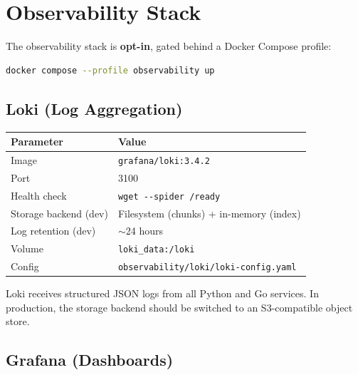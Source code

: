 
\section{Observability Stack}
\label{sec:observability}

The observability stack is \textbf{opt-in}, gated behind a Docker Compose
profile:

\begin{lstlisting}[language=bash, caption={Enabling the observability stack}]
docker compose --profile observability up
\end{lstlisting}

\subsection{Loki (Log Aggregation)}

\begin{tabular}{@{}ll@{}}
\toprule
\textbf{Parameter}    & \textbf{Value} \\
\midrule
Image                 & \texttt{grafana/loki:3.4.2} \\
Port                  & 3100 \\
Health check          & \texttt{wget -{}-spider /ready} \\
Storage backend (dev) & Filesystem (chunks) + in-memory (index) \\
Log retention (dev)   & $\sim$24 hours \\
Volume                & \texttt{loki\_data:/loki} \\
Config                & \texttt{observability/loki/loki-config.yaml} \\
\bottomrule
\end{tabular}

\medskip

Loki receives structured JSON logs from all Python and Go services.  In
production, the storage backend should be switched to an S3-compatible
object store.

\subsection{Grafana (Dashboards)}

